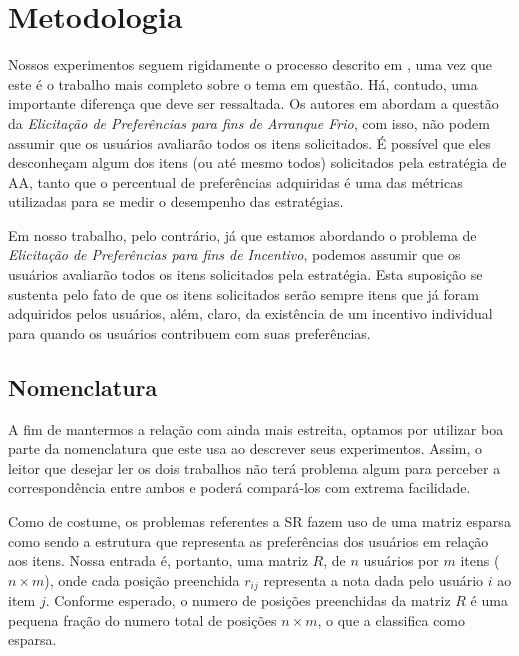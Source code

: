 \chapter{Metodologia}
\label{cap:metodologia}

Nossos experimentos seguem rigidamente o processo descrito em \citep{Elahi:2014:ALS:2542182.2542195}, uma vez que este é o trabalho mais completo sobre o tema em questão. Há, contudo, uma importante diferença que deve ser ressaltada. Os autores em \citep{Elahi:2014:ALS:2542182.2542195} abordam a questão da \textit{Elicitação de Preferências para fins de Arranque Frio}, com isso, não podem assumir que os usuários avaliarão todos os itens solicitados. É possível que eles desconheçam algum dos itens (ou até mesmo todos) solicitados pela estratégia de AA, tanto que o percentual de preferências adquiridas é uma das métricas utilizadas para se medir o desempenho das estratégias.

Em nosso trabalho, pelo contrário, já que estamos abordando o problema de \textit{Elicitação de Preferências para fins de Incentivo}, podemos assumir que os usuários avaliarão todos os itens solicitados pela estratégia. Esta suposição se sustenta pelo fato de que os itens solicitados serão sempre itens que já foram adquiridos pelos usuários, além, claro, da existência de um incentivo individual para quando os usuários contribuem com suas preferências.

\section{Nomenclatura} 

A fim de mantermos a relação com \citep{Elahi:2014:ALS:2542182.2542195} ainda mais estreita, optamos por utilizar boa parte da nomenclatura que este usa ao descrever seus experimentos. Assim, o leitor que desejar ler os dois trabalhos não terá problema algum para perceber a correspondência entre ambos e poderá compará-los com extrema facilidade.

Como de costume, os problemas referentes a SR fazem uso de uma matriz esparsa como sendo a estrutura que representa as preferências dos usuários em relação aos itens. Nossa entrada é, portanto, uma matriz $R$, de $n$ usuários por $m$ itens ($n\times m$), onde cada posição preenchida $r_{ij}$ representa a nota dada pelo usuário $i$ ao item $j$. Conforme esperado, o numero de posições preenchidas da matriz $R$ é uma pequena fração do numero total de posições $n\times m$, o que a classifica como esparsa.

